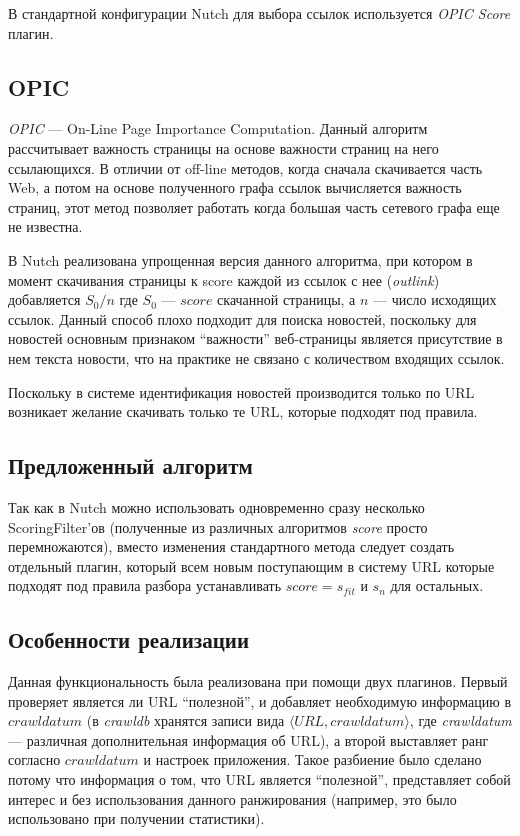 В стандартной конфигурации Nutch для выбора ссылок используется \textit{OPIC Score} плагин.
\subsection{OPIC}
\textit{OPIC} --- On-Line Page Importance Computation\cite{opic}. Данный алгоритм рассчитывает важность страницы на основе важности страниц на него ссылающихся. В отличии от off-line методов, когда сначала скачивается часть Web, а потом на основе полученного графа ссылок вычисляется важность страниц, этот метод позволяет работать когда большая часть сетевого графа еще не известна.

В Nutch реализована упрощенная версия данного алгоритма, при котором в момент скачивания страницы к score каждой из ссылок с нее (\textit{outlink}) добавляется $S_{0}/n$ где $S_{0}$ --- $score$ скачанной страницы, а $n$ --- число исходящих ссылок. Данный способ плохо подходит для поиска новостей, поскольку для новостей основным признаком ``важности'' веб-страницы является присутствие в нем текста новости, что на практике не связано с количеством входящих ссылок.

Поскольку в системе идентификация новостей производится только по URL возникает желание скачивать только те URL, которые подходят под правила.

\subsection{Предложенный алгоритм}
Так как в Nutch можно использовать одновременно сразу несколько ScoringFilter'ов (полученные из различных алгоритмов \textit{score} просто перемножаются), вместо изменения стандартного метода следует создать отдельный плагин, который всем новым поступающим в систему URL которые подходят под правила разбора устанавливать $score=s_{fit}$ и $s_{n}$ для остальных.
\subsection{Особенности реализации}
Данная функциональность была реализована при помощи двух плагинов. Первый проверяет является ли URL ``полезной'', и добавляет необходимую информацию в $crawldatum$ (в \textit{crawldb} хранятся записи вида $\langle URL, crawldatum\rangle$, где \textit{crawldatum} --- различная дополнительная информация об URL), а второй выставляет ранг согласно $crawldatum$ и настроек приложения. Такое разбиение было сделано потому что информация о том, что URL является ``полезной'', представляет собой интерес и без использования данного ранжирования (например, это было использовано при получении статистики).
